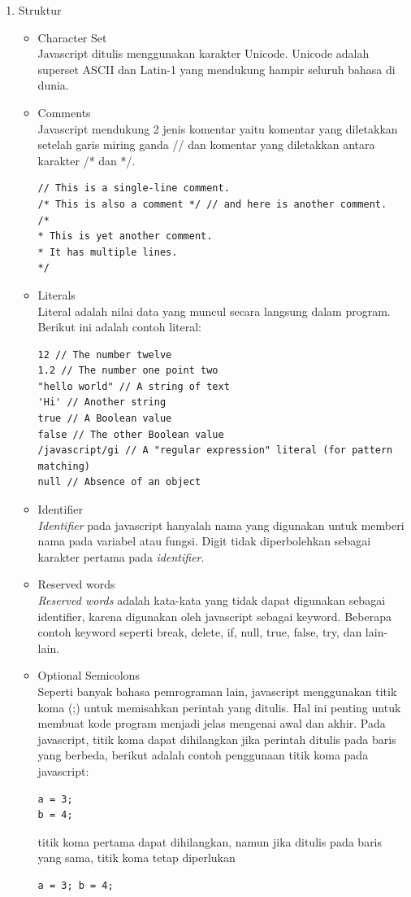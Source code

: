 \begin{enumerate}
\item Struktur

\begin{itemize}
\item Character Set \\
Javascript ditulis menggunakan karakter Unicode. Unicode adalah superset ASCII dan Latin-1 yang mendukung 
hampir seluruh bahasa di dunia.

\item Comments \\
Javascript mendukung 2 jenis komentar yaitu komentar yang diletakkan setelah garis miring ganda // dan komentar yang 
diletakkan antara karakter /* dan */.
\begin{verbatim}
// This is a single-line comment.
/* This is also a comment */ // and here is another comment.
/*
* This is yet another comment.
* It has multiple lines.
*/
\end{verbatim}

\item Literals \\
Literal adalah nilai data yang muncul secara langsung dalam program. Berikut ini
adalah contoh literal:
\begin{verbatim}
12 // The number twelve
1.2 // The number one point two
"hello world" // A string of text
'Hi' // Another string
true // A Boolean value
false // The other Boolean value
/javascript/gi // A "regular expression" literal (for pattern matching)
null // Absence of an object 
\end{verbatim}

\item Identifier \\
\textit{Identifier} pada javascript hanyalah nama yang digunakan untuk memberi
nama pada variabel atau fungsi. Digit tidak diperbolehkan sebagai karakter
pertama pada \textit{identifier}.

\item Reserved words \\
\textit{Reserved words} adalah kata-kata yang tidak dapat digunakan sebagai
identifier, karena digunakan oleh javascript sebagai keyword. Beberapa contoh keyword seperti break, delete, if, 
null, true, false, try, dan lain-lain.

\item Optional Semicolons \\
Seperti banyak bahasa pemrograman lain, javascript menggunakan titik koma (;) untuk memisahkan perintah 
yang ditulis. Hal ini penting untuk membuat kode program menjadi jelas mengenai awal dan akhir. Pada 
javascript, titik koma dapat dihilangkan jika perintah ditulis pada baris yang berbeda, berikut adalah 
contoh penggunaan titik koma pada javascript:
\begin{verbatim}
a = 3;
b = 4;
\end{verbatim}
titik koma pertama dapat dihilangkan, namun jika ditulis pada baris yang sama, titik koma tetap diperlukan
\begin{verbatim}
a = 3; b = 4;
\end{verbatim}
\end{itemize}


\end{enumerate}
